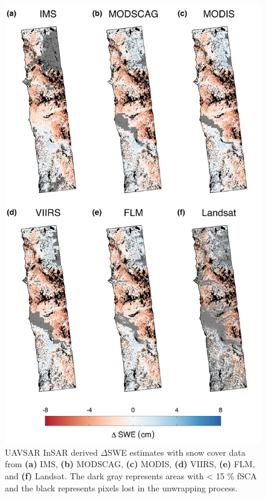 \clearpage
\begin{figure}[t]
\includegraphics[width=\textwidth]{figures/ch4_figs/dswe_uavsar_v2.png}
\centering
\caption{UAVSAR InSAR derived $\Delta$SWE estimates with snow cover data from \textbf{(a)} IMS, \textbf{(b)} MODSCAG, \textbf{(c)} MODIS, \textbf{(d)} VIIRS, \textbf{(e)} FLM, and \textbf{(f)} Landsat. The dark gray represents areas with < 15 \% fSCA and the black represents pixels lost in the unwrapping process.}
\label{fig:uavsar_dswe}
\end{figure}

